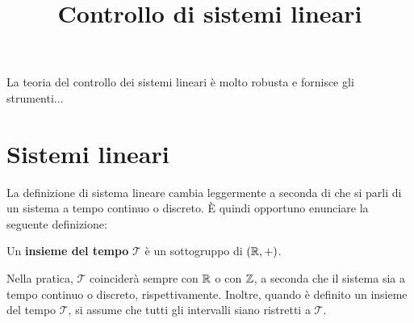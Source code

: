 \title{Controllo di sistemi lineari}
\maketitle
\label{sec:linear-control}

La teoria del controllo dei sistemi lineari è molto robusta e fornisce gli
strumenti... 

\iffalse
\section{Sistemi lineari}
La definizione di sistema lineare cambia leggermente a seconda di che si parli
di un sistema a tempo continuo o discreto.
È quindi opportuno enunciare la seguente definizione:

\begin{definition}
    Un \textbf{insieme del tempo} $\mathcal T$ è un sottogruppo di $(\mathbb{R}, +)$.
\end{definition}
Nella pratica, $\mathcal T$ coinciderà sempre con $\mathbb{R}$ o con $\mathbb{Z}$, a seconda
che il sistema sia a tempo continuo o discreto, rispettivamente.
Inoltre, quando è definito un insieme del tempo $\mathcal T$, si assume che tutti gli
intervalli siano ristretti a $\mathcal T$.

